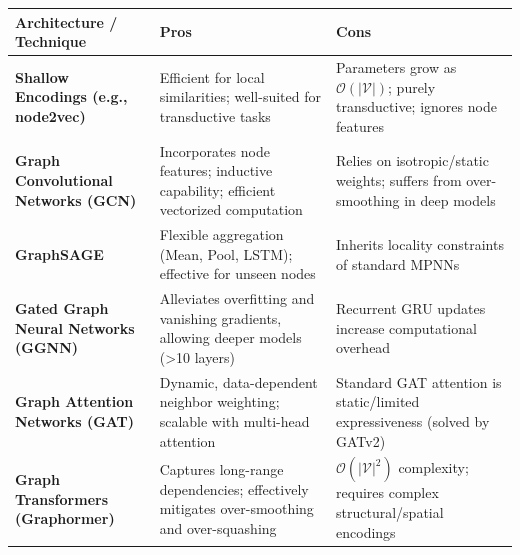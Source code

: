 \begin{table}[h]
\centering
\begin{tabularx}{\textwidth}{| >{\centering\arraybackslash}m{3.5cm} | X | X |}
\hline
\textbf{Architecture / Technique} & \textbf{Pros} & \textbf{Cons} \\
\hline
\textbf{Shallow Encodings (e.g., node2vec)} & Efficient for local similarities; well-suited for transductive tasks & Parameters grow as $\mathcal{O}(|\mathcal{V}|)$; purely transductive; ignores node features \\
\hline
\textbf{Graph Convolutional Networks (GCN)} & Incorporates node features; inductive capability; efficient vectorized computation & Relies on isotropic/static weights; suffers from over-smoothing in deep models \\
\hline
\textbf{GraphSAGE} & Flexible aggregation (Mean, Pool, LSTM); effective for unseen nodes & Inherits locality constraints of standard MPNNs \\
\hline
\textbf{Gated Graph Neural Networks (GGNN)} & Alleviates overfitting and vanishing gradients, allowing deeper models (>10 layers) & Recurrent GRU updates increase computational overhead \\
\hline
\textbf{Graph Attention Networks (GAT)} & Dynamic, data-dependent neighbor weighting; scalable with multi-head attention & Standard GAT attention is static/limited expressiveness (solved by GATv2) \\
\hline
\textbf{Graph Transformers (Graphormer)} & Captures long-range dependencies; effectively mitigates over-smoothing and over-squashing & $\mathcal{O}(|\mathcal{V}|^2)$ complexity; requires complex structural/spatial encodings \\
\hline
\end{tabularx}
\end{table}

